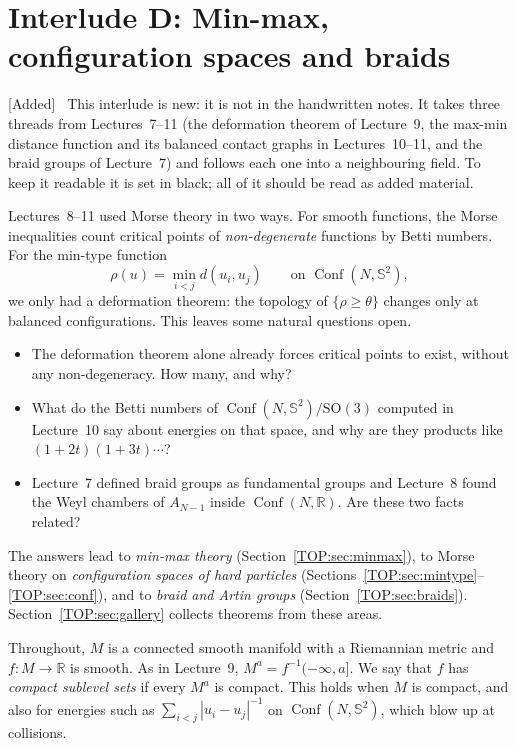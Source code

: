 \documentclass[11pt,openany]{book}
\theoremstyle{plain}
\theoremstyle{definition}
\theoremstyle{remark}
\newenvironment{addedblock}{\par\color{addcol}\noindent\textsf{\small[Added]}\ }{\par}
\newcommand{\R}{\mathbb{R}}
\newcommand{\Sph}{\mathbb{S}}          %
\newcommand{\SO}{\mathrm{SO}}
\newcommand{\Conf}{\operatorname{Conf}}
\newcommand{\abs}[1]{\left\lvert #1 \right\rvert}
\begin{document}
\chapter[Interlude D: Min-max and braids]{Interlude D: Min-max, configuration spaces and braids}
\label{TOP:ch}

\begin{addedblock}
This interlude is new: it is not in the handwritten notes. It takes three threads from
Lectures~7--11 (the deformation theorem of Lecture~9, the max-min distance function and its balanced
contact graphs in Lectures~10--11, and the braid groups of Lecture~7) and follows each one into a
neighbouring field. To keep it readable it is set in black; all of it should be read as added material.
\end{addedblock}

Lectures~8--11 used Morse theory in two ways. For smooth functions, the Morse inequalities count critical
points of \emph{non-degenerate} functions by Betti numbers. For the min-type function
\[
  \rho(u)=\min_{i<j}d(u_i,u_j)\qquad\text{on }\Conf(N,\Sph^2),
\]
we only had a deformation theorem: the topology of $\{\rho\ge\theta\}$ changes only at balanced
configurations. This leaves some natural questions open.
\begin{itemize}
\item The deformation theorem alone already forces critical points to exist, without any
  non-degeneracy. How many, and why?
\item What do the Betti numbers of $\Conf(N,\Sph^2)/\SO(3)$ computed in Lecture~10 say about energies on
  that space, and why are they products like $(1+2t)(1+3t)\cdots$?
\item Lecture~7 defined braid groups as fundamental groups and Lecture~8 found the Weyl chambers of
  $A_{N-1}$ inside $\Conf(N,\R)$. Are these two facts related?
\end{itemize}
The answers lead to \emph{min-max theory} (Section~\ref{TOP:sec:minmax}), to Morse theory on
\emph{configuration spaces of hard particles} (Sections~\ref{TOP:sec:mintype}--\ref{TOP:sec:conf}),
and to \emph{braid and Artin groups} (Section~\ref{TOP:sec:braids}). Section~\ref{TOP:sec:gallery}
collects theorems from these areas.

Throughout, $M$ is a connected smooth manifold with a Riemannian metric and $f\colon M\to\R$ is
smooth. As in Lecture~9, $M^a=f^{-1}(-\infty,a]$. We say that $f$ has \emph{compact sublevel sets} if
every $M^a$ is compact. This holds when $M$ is compact, and also for energies such as
$\sum_{i<j}\abs{u_i-u_j}^{-1}$ on $\Conf(N,\Sph^2)$, which blow up at collisions.
\end{document}
